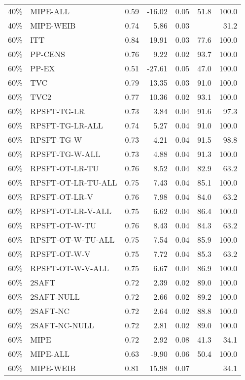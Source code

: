\begin{table}[ht]
{\begin{tabular}{llrrrrr}
  40\% & MIPE-ALL & 0.59 & -16.02 & 0.05 & 51.8 & 100.0 \\ 
  40\% & MIPE-WEIB & 0.74 & 5.86 & 0.03 &  & 31.2 \\ 
   \hline
60\% & ITT & 0.84 & 19.91 & 0.03 & 77.6 & 100.0 \\ 
  60\% & PP-CENS & 0.76 & 9.22 & 0.02 & 93.7 & 100.0 \\ 
  60\% & PP-EX & 0.51 & -27.61 & 0.05 & 47.0 & 100.0 \\ 
  60\% & TVC & 0.79 & 13.35 & 0.03 & 91.0 & 100.0 \\ 
  60\% & TVC2 & 0.77 & 10.36 & 0.02 & 93.1 & 100.0 \\ 
   \hline
60\% & RPSFT-TG-LR & 0.73 & 3.84 & 0.04 & 91.6 & 97.3 \\ 
  60\% & RPSFT-TG-LR-ALL & 0.74 & 5.27 & 0.04 & 91.0 & 100.0 \\ 
  60\% & RPSFT-TG-W & 0.73 & 4.21 & 0.04 & 91.5 & 98.8 \\ 
  60\% & RPSFT-TG-W-ALL & 0.73 & 4.88 & 0.04 & 91.3 & 100.0 \\ 
  60\% & RPSFT-OT-LR-TU & 0.76 & 8.52 & 0.04 & 82.9 & 63.2 \\ 
  60\% & RPSFT-OT-LR-TU-ALL & 0.75 & 7.43 & 0.04 & 85.1 & 100.0 \\ 
  60\% & RPSFT-OT-LR-V & 0.76 & 7.98 & 0.04 & 84.0 & 63.2 \\ 
  60\% & RPSFT-OT-LR-V-ALL & 0.75 & 6.62 & 0.04 & 86.4 & 100.0 \\ 
   \hline
60\% & RPSFT-OT-W-TU & 0.76 & 8.43 & 0.04 & 84.3 & 63.2 \\ 
  60\% & RPSFT-OT-W-TU-ALL & 0.75 & 7.54 & 0.04 & 85.9 & 100.0 \\ 
  60\% & RPSFT-OT-W-V & 0.75 & 7.72 & 0.04 & 85.3 & 63.2 \\ 
  60\% & RPSFT-OT-W-V-ALL & 0.75 & 6.67 & 0.04 & 86.9 & 100.0 \\ 
   \hline
60\% & 2SAFT & 0.72 & 2.39 & 0.02 & 89.0 & 100.0 \\ 
  60\% & 2SAFT-NULL & 0.72 & 2.66 & 0.02 & 89.2 & 100.0 \\ 
  60\% & 2SAFT-NC & 0.72 & 2.64 & 0.02 & 88.8 & 100.0 \\ 
  60\% & 2SAFT-NC-NULL & 0.72 & 2.81 & 0.02 & 89.0 & 100.0 \\ 
  60\% & MIPE & 0.72 & 2.92 & 0.08 & 41.3 & 34.1 \\ 
  60\% & MIPE-ALL & 0.63 & -9.90 & 0.06 & 50.4 & 100.0 \\ 
  60\% & MIPE-WEIB & 0.81 & 15.98 & 0.07 &  & 34.1 \\ 
   \hline
\end{tabular}
}
\end{table}
